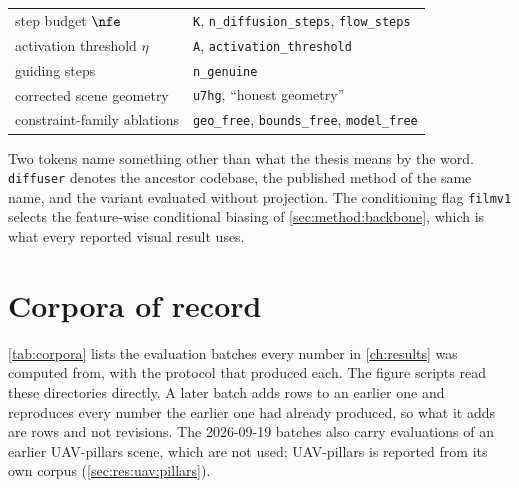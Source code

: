 \begin{table}[htpb]
\begin{tabularx}{\linewidth}{@{}L L@{}}
    step budget $\nfe$                  & \texttt{K}, \texttt{n\_diffusion\_steps}, \texttt{flow\_steps} \\
    activation threshold $\eta$         & \texttt{A}, \texttt{activation\_threshold} \\
    guiding steps                       & \texttt{n\_genuine} \\
    corrected scene geometry            & \texttt{u7hg}, ``honest geometry'' \\
    constraint-family ablations         & \texttt{geo\_free}, \texttt{bounds\_free}, \texttt{model\_free} \\
    \bottomrule
  \end{tabularx}
\end{table}

Two tokens name something other than what the thesis means by the word. \texttt{diffuser} denotes the ancestor codebase, the published method of the same name, and the variant evaluated without projection. The conditioning flag \texttt{filmv1} selects the feature-wise conditional biasing of \autoref{sec:method:backbone}, which is what every reported visual result uses.

\section*{Corpora of record}

\autoref{tab:corpora} lists the evaluation batches every number in \autoref{ch:results} was computed
from, with the protocol that produced each. The figure scripts read these directories directly. A later
batch adds rows to an earlier one and reproduces every number the earlier one had already produced, so
what it adds are rows and not revisions. The 2026-09-19 batches also carry evaluations of an earlier
UAV-pillars scene, which are not used; UAV-pillars is reported from its own corpus
(\autoref{sec:res:uav:pillars}).

